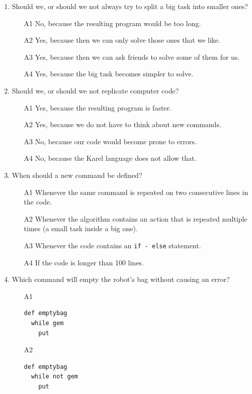 \documentclass[article,A4,12pt]{llncs}
\begin{document}
{{{{\begin{enumerate}
\item Should we, or should we not always try to split a big task into smaller ones?
\begin{enumerate}
\item[A1] No, because the resulting program would be too long.
\item[A2] Yes, because then we can only solve those ones that we like.
\item[A3] Yes, because then we can ask friends to solve some of them for us.
\item[A4] Yes, because the big task becomes simpler to solve.
\end{enumerate}
\item Should we, or should we not replicate computer code?
\begin{enumerate}
\item[A1] Yes, because the resulting program is faster.
\item[A2] Yes, because we do not have to think about new commands.
\item[A3] No, because our code would become prone to errors.
\item[A4] No, because the Karel language does not allow that.
\end{enumerate}
\item When should a new command be defined?
\begin{enumerate}
\item[A1] Whenever the same command is repeated on two consecutive lines in the code.
\item[A2] Whenever the algorithm contains an action that is repeated multiple times
          (a small task inside a big one).
\item[A3] Whenever the code contains an {\tt if - else} statement.
\item[A4] If the code is longer than 100 lines.
\end{enumerate}
\item Which command will empty the robot's bag without causing an error?
\begin{enumerate}
\item[A1] 
\begin{verbatim}
def emptybag
  while gem
    put
\end{verbatim}
\item[A2] 
\begin{verbatim}
def emptybag
  while not gem
    put
\end{verbatim}

\end{enumerate}
\end{enumerate}}}}}
\end{document}
